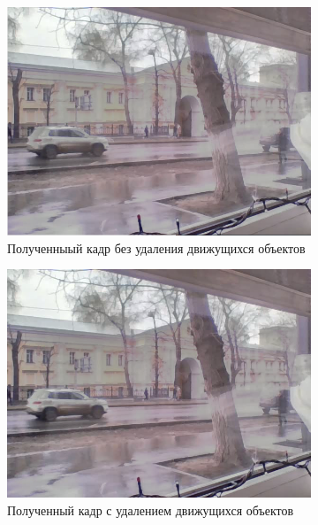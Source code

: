 \begin{figure}[!tbp]
  \centering
  \begin{subfigure}{.5\textwidth}
    \includegraphics[width=\textwidth]{img/hdr_car.png}
    \caption{ Полученныый кадр без удаления движущихся объектов}
    \label{fig:hdr_carmv}
  \end{subfigure}\hfill
  \begin{subfigure}{.5\textwidth}
    \includegraphics[width=\textwidth]{img/hdr_car_deghost.png}
    \caption{ Полученный кадр с удалением движущихся объектов}
    \label{fig:hdr_car_deghost2}
  \end{subfigure}\hfill
  \begin{subfigure}{.5\textwidth}

\end{subfigure}
\end{figure}
